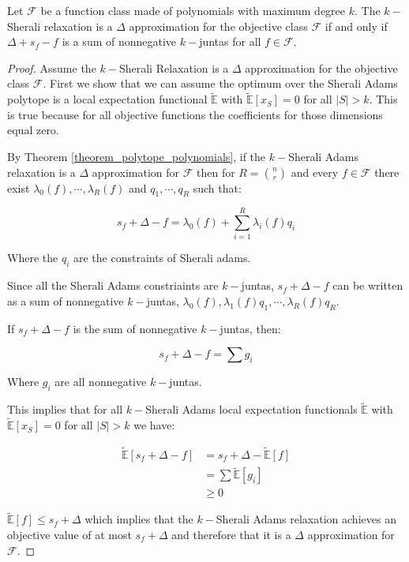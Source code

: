 \begin{theorem}
Let $\mathcal{F}$ be a function class made of polynomials with maximum degree $k$. The $k-$Sherali relaxation is a $\Delta$ approximation for the objective class $\mathcal{F}$ if and only if $\Delta + s_f - f$ is a sum of nonnegative $k-$juntas for all $f \in \mathcal{F}$. 
\end{theorem}

\begin{proof}

Assume the $k-$Sherali Relaxation is a $\Delta$ approximation for the objective class $\mathcal{F}$. First we show that we can assume the optimum over the Sherali Adams polytope is a local expectation functional $\tilde{\mathbb{E}}$ with $\tilde{\mathbb{E}}[x_S] =0$ for all $|S| > k$. This is true because for all objective functions the coefficients for those dimensions equal zero.

By Theorem \ref{theorem_polytope_polynomials}, if the $k-$Sherali Adams relaxation is a $\Delta$ approximation for $\mathcal{F}$ then for $R = \binom{n}{r}$ and every $f \in \mathcal{F}$ there exist $\lambda_0(f),\cdots, \lambda_R(f)$ and $q_1, \cdots, q_R$ such that:

\begin{equation}
s_f + \Delta  -f = \lambda_0(f) + \sum_{i=1}^R \lambda_i(f) q_i
\end{equation}

Where the $q_i$ are the constraints of Sherali adams.

Since all the Sherali Adams constriaints are $k-$juntas, $s_f + \Delta -f$ can be written as a sum of nonnegative $k-$juntas, $\lambda_0(f), \lambda_1(f)q_1, \cdots, \lambda_R(f)q_R$.

If $s_f + \Delta -f $ is the sum of nonnegative $k-$juntas, then:

\begin{equation}
s_f + \Delta - f  = \sum g_i
\end{equation}

Where $g_i$ are all nonnegative $k-$juntas. 

This implies that for all $k-$Sherali Adams local expectation functionals $\tilde{\mathbb{E}}$ with $\tilde{\mathbb{E}}[x_S] = 0$ for all $|S|>k$ we have:

\begin{align}
\tilde{\mathbb{E}}[s_f + \Delta -f] &= s_f  + \Delta - \tilde{\mathbb{E}}[f] \\
                                    &= \sum \tilde{\mathbb{E}}[g_i]   \\ 
                                    &\geq 0
\end{align}


$\tilde{\mathbb{E}}[f] \leq s_f + \Delta$ which implies that the $k-$Sherali Adams relaxation achieves an objective value of at most $s_f + \Delta$   and therefore that it is a $\Delta$ approximation for $\mathcal{F}$.

\end{proof}


